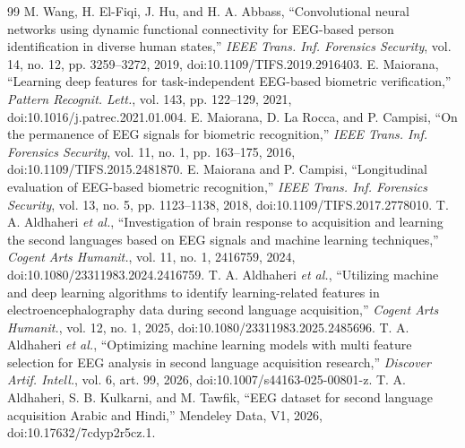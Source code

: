 \documentclass[conference]{IEEEtran}
\begin{document}
\begin{thebibliography}{99}
 M. Wang, H. El-Fiqi, J. Hu, and H. A. Abbass, ``Convolutional neural networks using dynamic functional connectivity for EEG-based person identification in diverse human states,'' \emph{IEEE Trans. Inf. Forensics Security}, vol. 14, no. 12, pp. 3259--3272, 2019, doi:10.1109/TIFS.2019.2916403.
 E. Maiorana, ``Learning deep features for task-independent EEG-based biometric verification,'' \emph{Pattern Recognit. Lett.}, vol. 143, pp. 122--129, 2021, doi:10.1016/j.patrec.2021.01.004.
 E. Maiorana, D. La Rocca, and P. Campisi, ``On the permanence of EEG signals for biometric recognition,'' \emph{IEEE Trans. Inf. Forensics Security}, vol. 11, no. 1, pp. 163--175, 2016, doi:10.1109/TIFS.2015.2481870.
 E. Maiorana and P. Campisi, ``Longitudinal evaluation of EEG-based biometric recognition,'' \emph{IEEE Trans. Inf. Forensics Security}, vol. 13, no. 5, pp. 1123--1138, 2018, doi:10.1109/TIFS.2017.2778010.
 T. A. Aldhaheri \emph{et al.}, ``Investigation of brain response to acquisition and learning the second languages based on EEG signals and machine learning techniques,'' \emph{Cogent Arts Humanit.}, vol. 11, no. 1, 2416759, 2024, doi:10.1080/23311983.2024.2416759.
 T. A. Aldhaheri \emph{et al.}, ``Utilizing machine and deep learning algorithms to identify learning-related features in electroencephalography data during second language acquisition,'' \emph{Cogent Arts Humanit.}, vol. 12, no. 1, 2025, doi:10.1080/23311983.2025.2485696.
 T. A. Aldhaheri \emph{et al.}, ``Optimizing machine learning models with multi feature selection for EEG analysis in second language acquisition research,'' \emph{Discover Artif. Intell.}, vol. 6, art. 99, 2026, doi:10.1007/s44163-025-00801-z.
 T. A. Aldhaheri, S. B. Kulkarni, and M. Tawfik, ``EEG dataset for second language acquisition Arabic and Hindi,'' Mendeley Data, V1, 2026, doi:10.17632/7cdyp2r5cz.1.
\end{thebibliography}
\end{document}
